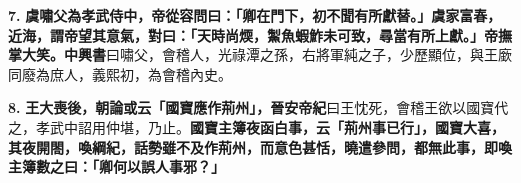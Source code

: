 \textbf{7.} \textbf{虞嘯父為孝武侍中，帝從容問曰：「卿在門下，初不聞有所獻替。」虞家富春，近海，謂帝望其意氣，對曰：「天時尚煗，䱥魚蝦鮓未可致，尋當有所上獻。」帝撫掌大笑。}{\footnotesize \textbf{中興書}曰嘯父，會稽人，光祿潭之孫，右將軍純之子，少歷顯位，與王廞同廢為庶人，義熙初，為會稽內史。}

\textbf{8.} \textbf{王大喪後，朝論或云「國寶應作荊州」，}{\footnotesize \textbf{晉安帝紀}曰王忱死，會稽王欲以國寶代之，孝武中詔用仲堪，乃止。}\textbf{國寶主簿夜函白事，云「荊州事已行」，國寶大喜，其夜開閤，喚綱紀，話勢雖不及作荊州，而意色甚恬，曉遣參問，都無此事，即喚主簿數之曰：「卿何以誤人事邪？」}